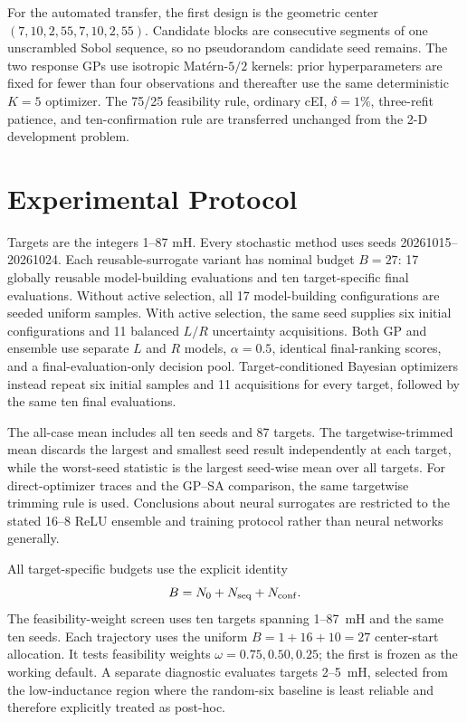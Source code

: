 \documentclass[conference]{IEEEtran}
\begin{document}
For the automated transfer, the first design is the geometric center $(7,10,2,55,7,10,2,55)$. Candidate blocks are consecutive segments of one unscrambled Sobol sequence, so no pseudorandom candidate seed remains. The two response GPs use isotropic Mat\'ern-$5/2$ kernels: prior hyperparameters are fixed for fewer than four observations and thereafter use the same deterministic $K=5$ optimizer. The 75/25 feasibility rule, ordinary cEI, $\delta=1\%$, three-refit patience, and ten-confirmation rule are transferred unchanged from the 2-D development problem.

\section{Experimental Protocol}
Targets are the integers 1--87 mH. Every stochastic method uses seeds 20261015--20261024. Each reusable-surrogate variant has nominal budget $B=27$: 17 globally reusable model-building evaluations and ten target-specific final evaluations. Without active selection, all 17 model-building configurations are seeded uniform samples. With active selection, the same seed supplies six initial configurations and 11 balanced $L/R$ uncertainty acquisitions. Both GP and ensemble use separate $L$ and $R$ models, $\alpha=0.5$, identical final-ranking scores, and a final-evaluation-only decision pool. Target-conditioned Bayesian optimizers instead repeat six initial samples and 11 acquisitions for every target, followed by the same ten final evaluations.

The all-case mean includes all ten seeds and 87 targets. The targetwise-trimmed mean discards the largest and smallest seed result independently at each target, while the worst-seed statistic is the largest seed-wise mean over all targets. For direct-optimizer traces and the GP--SA comparison, the same targetwise trimming rule is used. Conclusions about neural surrogates are restricted to the stated 16--8 ReLU ensemble and training protocol rather than neural networks generally.

All target-specific budgets use the explicit identity
\begin{equation}
B=N_0+N_{\rm seq}+N_{\rm conf}.
\end{equation}
The feasibility-weight screen uses ten targets spanning 1--87~mH and the same ten seeds. Each trajectory uses the uniform $B=1+16+10=27$ center-start allocation. It tests feasibility weights $\omega=0.75,0.50,0.25$; the first is frozen as the working default. A separate diagnostic evaluates targets 2--5~mH, selected from the low-inductance region where the random-six baseline is least reliable and therefore explicitly treated as post-hoc.
\end{document}
